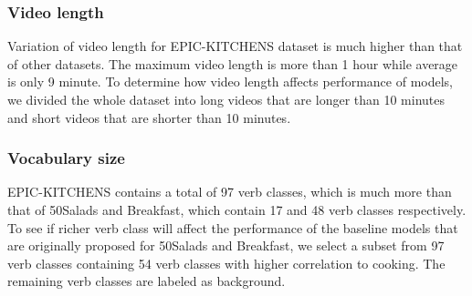 

\subsubsection{Video length}
Variation of video length for EPIC-KITCHENS dataset is much higher than that of other datasets. The maximum video length is more than 1 hour while average is only 9 minute. To determine how video length affects performance of models, we divided the whole dataset into long videos that are longer than 10 minutes and short videos that are shorter than 10 minutes.  

\subsubsection{Vocabulary size}
EPIC-KITCHENS contains a total of 97 verb classes, which is much more than that of 50Salads and Breakfast, which contain 17 and 48 verb classes respectively. To see if richer verb class will affect the performance of the baseline models that are originally proposed for 50Salads and Breakfast, we select a subset from 97 verb classes containing 54 verb classes with higher correlation to cooking. The remaining verb classes are labeled as background. 

